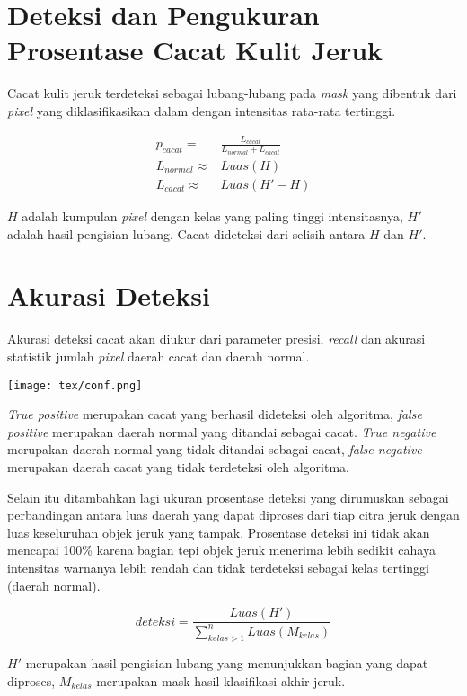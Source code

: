 \documentclass[laporan.tex]{subfiles}
\begin{document}
\section{Deteksi dan Pengukuran Prosentase Cacat Kulit Jeruk}

Cacat kulit jeruk terdeteksi sebagai lubang-lubang pada \emph{mask} yang dibentuk dari \emph{pixel} yang diklasifikasikan dalam dengan intensitas rata-rata tertinggi.

\begin{align}
	p_{cacat} = & \frac{L_{cacat}}{L_{normal} + L_{cacat}} \\
	L_{normal} \approx & Luas(H) \\
	L_{cacat} \approx & Luas(H' - H)
\end{align}

$H$ adalah kumpulan \emph{pixel} dengan kelas yang paling tinggi intensitasnya, $H'$ adalah hasil pengisian lubang. Cacat dideteksi dari selisih antara $H$ dan $H'$.

\section{Akurasi Deteksi}

Akurasi deteksi cacat akan diukur dari parameter presisi, \emph{recall} dan akurasi statistik jumlah \emph{pixel} daerah cacat dan daerah normal.

\texttt{[image: tex/conf.png]}

\emph{True positive} merupakan cacat yang berhasil dideteksi oleh algoritma, \emph{false positive} merupakan daerah normal yang ditandai sebagai cacat. \emph{True negative} merupakan daerah normal yang tidak ditandai sebagai cacat, \emph{false negative} merupakan daerah cacat yang tidak terdeteksi oleh algoritma.

Selain itu ditambahkan lagi ukuran prosentase deteksi yang dirumuskan sebagai perbandingan antara luas daerah yang dapat diproses dari tiap citra jeruk dengan luas keseluruhan objek jeruk yang tampak. Prosentase deteksi ini tidak akan mencapai 100\% karena bagian tepi objek jeruk menerima lebih sedikit cahaya intensitas warnanya lebih rendah dan tidak terdeteksi sebagai kelas tertinggi (daerah normal).

\begin{equation}
	deteksi = \frac{Luas(H')}{\sum_{kelas>1}^n Luas(M_{kelas})}
\end{equation}

$H'$ merupakan hasil pengisian lubang yang menunjukkan bagian yang dapat diproses, $M_{kelas}$ merupakan mask hasil klasifikasi akhir jeruk.
\end{document}
